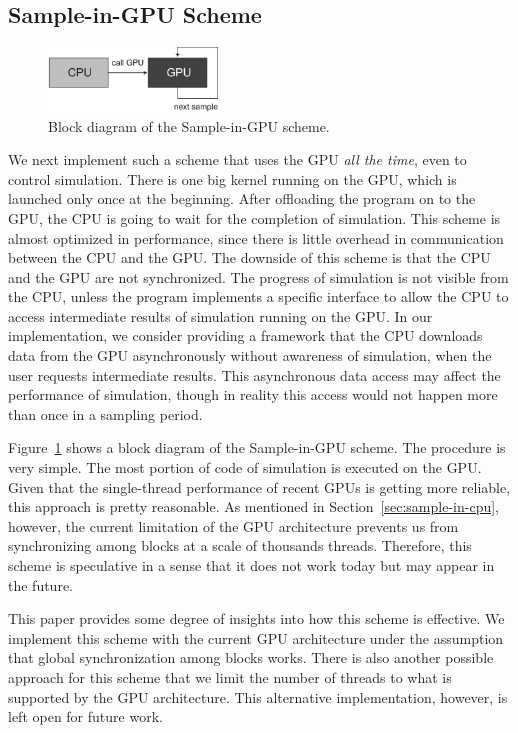 \documentclass[times, 10pt, twocolumn]{article}
\begin{document}
\subsection{Sample-in-GPU Scheme}
\label{sec:sample-in-gpu}

\begin{figure}[t]
\centering
\includegraphics[width=0.4\textwidth]{eps/sample-in-gpu.eps}
\caption{Block diagram of the Sample-in-GPU scheme.}
\label{fig:sample-in-gpu}
\end{figure}

We next implement such a scheme that uses the GPU \textit{all the time},
even to control simulation.
There is one big kernel running on the GPU, which is launched only once
at the beginning.
After offloading the program on to the GPU, the CPU is going to wait for
the completion of simulation.
This scheme is almost optimized in performance, since there is little
overhead in communication between the CPU and the GPU.
The downside of this scheme is that the CPU and the GPU are not
synchronized.
The progress of simulation is not visible from the CPU, unless the
program implements a specific interface to allow the CPU to access
intermediate results of simulation running on the GPU.
In our implementation, we consider providing a framework that the CPU
downloads data from the GPU asynchronously without awareness of
simulation, when the user requests intermediate results.
This asynchronous data access may affect the performance of simulation,
though in reality this access would not happen more than once in a
sampling period.

Figure~\ref{fig:sample-in-gpu} shows a block diagram of the
Sample-in-GPU scheme.
The procedure is very simple.
The most portion of code of simulation is executed on the GPU.
Given that the single-thread performance of recent GPUs is getting more
reliable, this approach is pretty reasonable.
As mentioned in Section~\ref{sec:sample-in-cpu}, however, the current
limitation of the GPU architecture prevents us from synchronizing among
blocks at a scale of thousands threads.
Therefore, this scheme is speculative in a sense that it does not work today
but may appear in the future.

This paper provides some degree of insights into how this scheme is
effective.
We implement this scheme with the current GPU architecture under the
assumption that global synchronization among blocks works.
There is also another possible approach for this scheme that we limit
the number of threads to what is supported by the GPU architecture.
This alternative implementation, however, is left open for future work.
\end{document}
